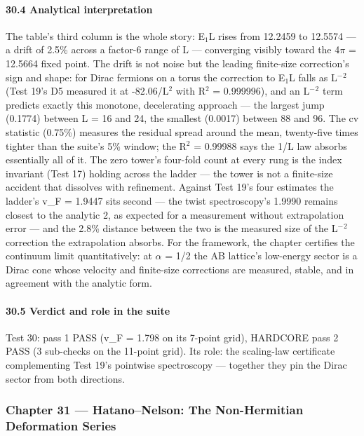 \documentclass[10pt]{article}
\begin{document}
\paragraph{30.4 Analytical interpretation}

The table's third column is the whole story: E$_1$\textperiodcentered{}L rises from 12.2459 to 12.5574 --- a drift of 2.5\% across a factor-6 range of L --- converging visibly toward the 4$\pi$ = 12.5664 fixed point. The drift is not noise but the leading finite-size correction's sign and shape: for Dirac fermions on a torus the correction to E$_1$\textperiodcentered{}L falls as L$^-$$^2$ (Test 19's D5 measured it at -82.06/L$^2$ with R$^2$ = 0.999996), and an L$^-$$^2$ term predicts exactly this monotone, decelerating approach --- the largest jump (0.1774) between L = 16 and 24, the smallest (0.0017) between 88 and 96. The cv statistic (0.75\%) measures the residual spread around the mean, twenty-five times tighter than the suite's 5\% window; the R$^2$ = 0.99988 says the 1/L law absorbs essentially all of it. The zero tower's four-fold count at every rung is the index invariant (Test 17) holding across the ladder --- the tower is not a finite-size accident that dissolves with refinement. Against Test 19's four estimates the ladder's v\_F = 1.9447 sits second --- the twist spectroscopy's 1.9990 remains closest to the analytic 2, as expected for a measurement without extrapolation error --- and the 2.8\% distance between the two is the measured size of the L$^-$$^2$ correction the extrapolation absorbs. For the framework, the chapter certifies the continuum limit quantitatively: at $\alpha$ = 1/2 the AB lattice's low-energy sector is a Dirac cone whose velocity and finite-size corrections are measured, stable, and in agreement with the analytic form.

\paragraph{30.5 Verdict and role in the suite}

Test 30: pass 1 PASS (v\_F = 1.798 on its 7-point grid), HARDCORE pass 2 PASS (3 sub-checks on the 11-point grid). Its role: the scaling-law certificate complementing Test 19's pointwise spectroscopy --- together they pin the Dirac sector from both directions.

\subsubsection{Chapter 31 --- Hatano--Nelson: The Non-Hermitian Deformation Series}
\end{document}
